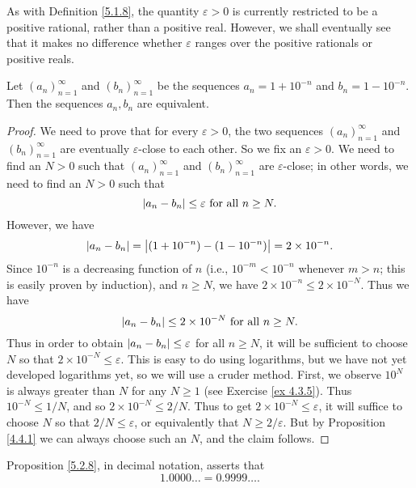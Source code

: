 \begin{remark}\label{5.2.7}
As with Definition \ref{5.1.8}, the quantity \(\varepsilon > 0\) is currently restricted to be a positive rational, rather than a positive real.
However, we shall eventually see that it makes no difference whether \(\varepsilon\) ranges over the positive rationals or positive reals.
\end{remark}

\begin{proposition}\label{5.2.8}
Let \((a_n)_{n = 1}^{\infty}\) and \((b_n)_{n = 1}^{\infty}\) be the sequences \(a_n = 1 + 10^{-n}\) and \(b_n = 1 - 10^{-n}\).
Then the sequences \(a_n, b_n\) are equivalent.
\end{proposition}

\begin{proof}
We need to prove that for every \(\varepsilon > 0\), the two sequences \((a_n)_{n = 1}^{\infty}\) and \((b_n)_{n = 1}^{\infty}\) are eventually \(\varepsilon\)-close to each other.
So we fix an \(\varepsilon > 0\).
We need to find an \(N > 0\) such that \((a_n)_{n = 1}^{\infty}\) and \((b_n)_{n = 1}^{\infty}\) are \(\varepsilon\)-close;
in other words, we need to find an \(N > 0\) such that
\[
    \abs*{a_n - b_n} \leq \varepsilon \text{ for all } n \geq N.
\]
However, we have
\[
    \abs*{a_n - b_n} = \abs*{(1 + 10^{-n}) - (1 - 10^{-n})} = 2 \times 10^{-n}.
\]
Since \(10^{-n}\) is a decreasing function of \(n\) (i.e., \(10^{-m} < 10^{-n}\) whenever \(m > n\);
this is easily proven by induction), and \(n \geq N\), we have \(2 \times 10^{-n} \leq 2 \times 10^{-N}\).
Thus we have
\[
    \abs*{a_n - b_n} \leq 2 \times 10^{-N} \text{ for all } n \geq N.
\]
Thus in order to obtain \(\abs*{a_n - b_n} \leq \varepsilon\) for all \(n \geq N\), it will be sufficient to choose \(N\) so that \(2 \times 10^{-N} \leq \varepsilon\).
This is easy to do using logarithms, but we have not yet developed logarithms yet, so we will use a cruder method.
First, we observe \(10^N\) is always greater than \(N\) for any \(N \geq 1\) (see Exercise \ref{ex 4.3.5}).
Thus \(10^{-N} \leq 1 / N\), and so \(2 \times 10^{-N} \leq 2 / N\).
Thus to get \(2 \times 10^{-N} \leq \varepsilon\), it will suffice to choose \(N\) so that \(2 / N \leq \varepsilon\), or equivalently that \(N \geq 2 / \varepsilon\).
But by Proposition \ref{4.4.1} we can always choose such an \(N\), and the claim follows.
\end{proof}

\begin{remark}\label{5.2.9}
Proposition \ref{5.2.8}, in decimal notation, asserts that
\[
    1.0000 \dots = 0.9999 \dots.
\]
\end{remark}

